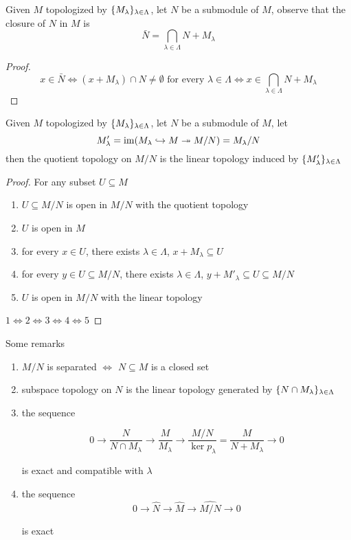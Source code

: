 \begin{proposition}
	Given $M$ topologized by $\{M_\lambda\}_{\lambda \in \Lambda}$, let $N$ be a submodule of $M$, observe that the closure of $N$ in $M$ is
	$$
		\bar{N} = \bigcap_{\lambda \in \Lambda} N + M_\lambda
	$$
\end{proposition}

\begin{proof}
	$$
		x \in \bar{N} \iff (x + M_\lambda) \cap N \neq \emptyset \text{ for every } \lambda \in \Lambda \iff x \in \bigcap_{\lambda \in \Lambda} N + M_\lambda
	$$
\end{proof}

\begin{proposition}
	Given $M$ topologized by $\{M_\lambda\}_{\lambda \in \Lambda}$, let $N$ be a submodule of $M$, let
	$$
		M'_\lambda = \operatorname{im}(M_\lambda \hookrightarrow M \twoheadrightarrow M / N) = M_\lambda / N
	$$
	then the quotient topology on $M / N$ is the linear topology induced by $\{M'_\lambda\}_{\lambda \in \Lambda}$
\end{proposition}

\begin{proof}
	For any subset $U \subseteq M$
	\begin{enumerate}
		\item $U \subseteq M / N$ is open in $M / N$ with the quotient topology
		\item $U$ is open in $M$
		\item for every $x \in U$, there exists $\lambda \in \Lambda$, $x + M_\lambda \subseteq U$
		\item for every $y \in U \subseteq M / N$, there exists $\lambda \in \Lambda$, $y + M'_\lambda \subseteq U \subseteq M / N$
		\item $U$ is open in $M / N$ with the linear topology
	\end{enumerate}
	
	$1 \iff 2 \iff 3 \iff 4 \iff 5$
\end{proof}

\begin{remark}
	Some remarks
	\begin{enumerate}
		\item $M / N$ is separated $\iff$ $N \subseteq M$ is a closed set
		\item subspace topology on $N$ is the linear topology generated by $\{N \cap M_\lambda\}_{\lambda \in \Lambda}$
		\item the sequence 
		
		$$
			0 \to \frac{N}{N \cap M_\lambda} \to \frac{M}{M_\lambda} \to \frac{M / N}{\ker p_\lambda} = \frac{M}{N + M_\lambda} \to 0
		$$
		
		is exact and compatible with $\lambda$
		
		\item the sequence
		$$
			0 \to \hat{N} \to \hat{M} \to \widehat{M / N} \to 0
		$$
		
		is exact
	\end{enumerate}
\end{remark}

